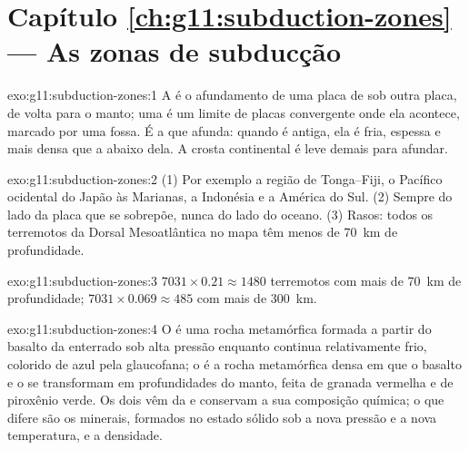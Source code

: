 \section*{Capítulo \ref{ch:g11:subduction-zones} --- As zonas de subducção}

\begin{solution}{exo:g11:subduction-zones:1}
A  é o afundamento de uma placa de  sob outra
placa, de volta para o manto; uma  é um limite de placas
convergente onde ela acontece, marcado por uma fossa. É a 
que afunda: quando é antiga, ela é fria, espessa e mais densa que a
 abaixo dela. A crosta continental é leve demais para afundar.
\end{solution}

\begin{solution}{exo:g11:subduction-zones:2}
(1) Por exemplo a região de Tonga--Fiji, o Pacífico ocidental do Japão às
Marianas, a Indonésia e a América do Sul. (2) Sempre do lado da placa que se
sobrepõe, nunca do lado do oceano. (3) Rasos: todos os terremotos da Dorsal
Mesoatlântica no mapa têm menos de \qty{70}{km} de profundidade.
\end{solution}

\begin{solution}{exo:g11:subduction-zones:3}
$7031 \times 0.21 \approx 1480$ terremotos com mais de \qty{70}{km} de
profundidade; $7031 \times 0.069 \approx 485$ com mais de \qty{300}{km}.
\end{solution}

\begin{solution}{exo:g11:subduction-zones:4}
O  é uma rocha metamórfica formada a partir do basalto da  enterrado sob alta pressão enquanto continua relativamente frio,
colorido de azul pela glaucofana; o  é a rocha metamórfica densa em
que o basalto e o  se transformam em profundidades do manto, feita de
granada vermelha e de piroxênio verde. Os dois vêm da  e
conservam a sua composição química; o que difere são os minerais, formados
no estado sólido sob a nova pressão e a nova temperatura, e a densidade.
\end{solution}


